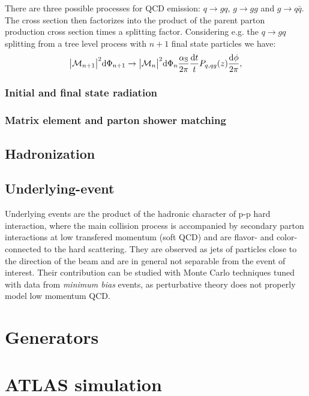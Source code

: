 There are three possible processes for QCD emission: $q\to gq$, $g\to gg$ and $g\to q\bar{q}$.
The cross section then factorizes into the product of the parent parton production cross section times
 a splitting factor. Considering e.g. the $q\to gq$ splitting from a tree level process with $n+1$
final state particles we have:
\begin{equation}
  \big|\mathcal{M}_{n+1}\big|^2{\rm d}\Phi_{n+1} \to 
  \big|\mathcal{M}_{n}\big|^2{\rm d}\Phi_{n} \dfrac{\alphas}{2\pi}\dfrac{{\rm d}t}{t}P_{q,qg}(z)\dfrac{{\rm d}\phi}{2\pi},
\label{eq:splitting1}
\end{equation}


\subsubsection{Initial and final state radiation}\label{sec:isrfsr}



\subsubsection{Matrix element and parton shower matching}\label{sec:matching}

\subsection{Hadronization}\label{sec:hadronization}


\subsection{Underlying-event}\label{sec:underlyingevent}

Underlying events are the product of the hadronic character of p-p hard interaction, where the main collision process
is accompanied by secondary parton interactions at low transfered momentum (soft QCD) and are flavor- and color-connected to the
hard scattering. They are observed as jets of particles close to the direction of the beam and are in general not 
separable from the event of interest. Their contribution can be studied with Monte Carlo techniques tuned with data from 
\textit{minimum bias} events, as perturbative theory does not properly model low momentum QCD.


\section{Generators}\label{sec:generators}

\section{ATLAS simulation}\label{sec:MCdetector}
